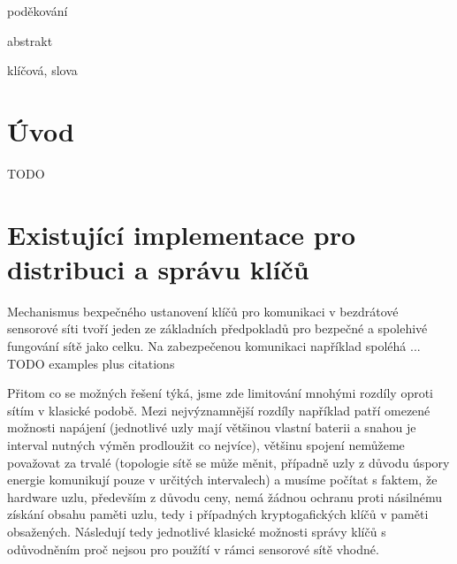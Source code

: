 \documentclass[11pt,final,twoside]{fithesis2}
\begin{document}
\FrontMatter
\ThesisTitlePage

\begin{ThesisDeclaration}
  \DeclarationText
  \AdvisorName
\end{ThesisDeclaration}

\begin{ThesisThanks}
poděkování
\end{ThesisThanks}

\begin{ThesisAbstract}
abstrakt
\end{ThesisAbstract}

\begin{ThesisKeyWords}
klíčová, slova
\end{ThesisKeyWords}

\MainMatter

\tableofcontents

\chapter{Úvod}


TODO

\chapter{Existující implementace pro distribuci a správu klíčů}
Mechanismus bexpečného ustanovení klíčů pro komunikaci v bezdrátové sensorové síti tvoří jeden ze základních předpokladů 
pro bezpečné a spolehivé fungování sítě jako celku. Na zabezpečenou komunikaci například spoléhá ... TODO examples plus citations

Přitom co se možných řešení týká, jsme zde limitování mnohými rozdíly oproti sítím v klasické podobě. Mezi nejvýznamnější rozdíly například
patří omezené možnosti napájení (jednotlivé uzly mají většinou vlastní baterii a snahou je interval nutných výměn prodloužit co nejvíce), 
většinu spojení nemůžeme považovat za trvalé (topologie sítě se může měnit, případně uzly z důvodu úspory energie komunikují pouze v určitých 
intervalech) a musíme počítat s faktem, že hardware uzlu, především z důvodu ceny, nemá žádnou ochranu proti násilnému získání obsahu paměti uzlu, 
tedy i případných kryptogafických klíčů v paměti obsažených. Následují tedy jednotlivé klasické možnosti správy klíčů s odůvodněním proč nejsou pro 
použítí v rámci sensorové sítě vhodné.
\end{document}
